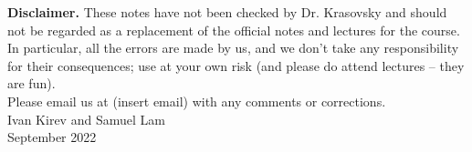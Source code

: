 \textbf{Disclaimer.} These notes have not been checked by Dr. Krasovsky and should not be regarded as a replacement of the official notes and lectures for the course. In particular, all the errors are made by us, and we don't take any responsibility for their consequences; use at your own risk (and please do attend lectures -- they are fun). \\

Please email us at (insert email) with any comments or corrections.\\

Ivan Kirev and Samuel Lam \\
September 2022\\

\begin{center}
\end{center}

\newpage 

{\pagestyle{empty}
\tableofcontents}
\newpage